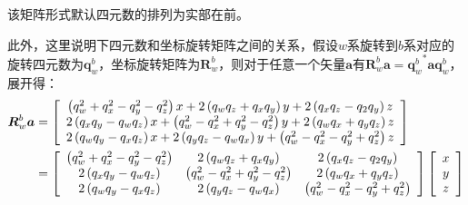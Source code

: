 该矩阵形式默认四元数的排列为实部在前。

此外，这里说明下四元数和坐标旋转矩阵之间的关系，假设$w$系旋转到$b$系对应的旋转四元数为$\bm{q}_w^b$，坐标旋转矩阵为$\bm{R}_w^b$，则对于任意一个矢量$\bm{a}$有$\bm{R}_w^b\bm{a}={\bm{q}_w^b}^\ast\bm{a}\bm{q}_w^b$，展开得：
\begin{equation}
\centering
\begin{aligned}
\bm{R}_w^b\bm{a}&=\left[\begin{array}{c}
\left(q_w^2+q_x^2-q_y^2-q_z^2\right)x + 2\left(q_wq_z+q_xq_y\right)y+2\left(q_xq_z-q_2q_y\right)z\\
2\left(q_xq_y-q_wq_z\right)x+\left(q_w^2-q_x^2+q_y^2-q_z^2\right)y+2\left(q_wq_x+q_yq_z\right)z\\
2\left(q_wq_y-q_xq_z\right)x+2\left(q_yq_z-q_wq_x\right)y+\left(q_w^2-q_x^2-q_y^2+q_z^2\right)z
\end{array}\right]\\
&=\left[\begin{array}{ccc}
\left(q_w^2+q_x^2-q_y^2-q_z^2\right) & 2\left(q_wq_z+q_xq_y\right) & 2\left(q_xq_z-q_2q_y\right)\\
2\left(q_xq_y-q_wq_z\right) & \left(q_w^2-q_x^2+q_y^2-q_z^2\right) & 2\left(q_wq_x+q_yq_z\right)\\
2\left(q_wq_y-q_xq_z\right) & 2\left(q_yq_z-q_wq_x\right) & \left(q_w^2-q_x^2-q_y^2+q_z^2\right)
\end{array}\right]\left[\begin{array}{c}x\\y\\z\end{array}\right]
\end{aligned}
\end{equation}
